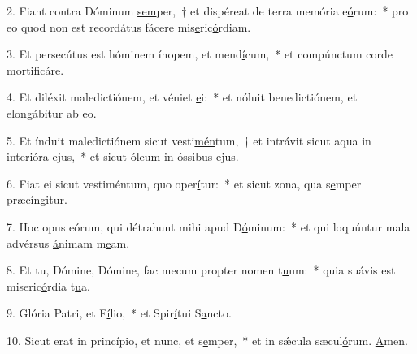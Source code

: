 2. Fiant contra Dóminum \uline{sem}per,~† et dispéreat de terra memória e\uline{ó}rum:~* pro eo quod non est recordátus fácere mis\uline{e}ric\uline{ó}rdiam.\par 
3. Et persecútus est hóminem ínopem, et mend\uline{í}cum,~* et compúnctum corde mort\uline{i}fic\uline{á}re.\par 
4. Et diléxit maledictiónem, et véniet \uline{e}i:~* et nóluit benedictiónem, et elongábit\uline{u}r ab \uline{e}o.\par 
5. Et índuit maledictiónem sicut vesti\uline{mén}tum,~† et intrávit sicut aqua in interióra \uline{e}jus,~* et sicut óleum in \uline{ó}ssibus \uline{e}jus.\par 
6. Fiat ei sicut vestiméntum, quo oper\uline{í}tur:~* et sicut zona, qua s\uline{e}mper præc\uline{í}ngitur.\par 
7. Hoc opus eórum, qui détrahunt mihi apud D\uline{ó}minum:~* et qui loquúntur mala advérsus \uline{á}nimam m\uline{e}am.\par 
8. Et tu, Dómine, Dómine, fac mecum propter nomen t\uline{u}um:~* quia suávis est miseric\uline{ó}rdia t\uline{u}a.\par 
9. Glória Patri, et F\uline{í}lio,~* et Spir\uline{í}tui S\uline{a}ncto.\par 
10. Sicut erat in princípio, et nunc, et s\uline{e}mper,~* et in sǽcula sæcul\uline{ó}rum. \uline{A}men.\par 
